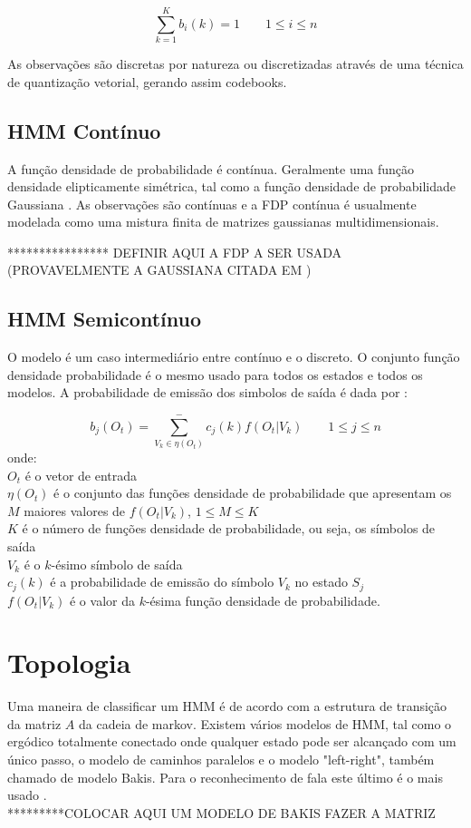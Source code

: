 $$
\displaystyle \sum_{k=1}^K b_i (k) = 1 \qquad 1 \leq i \leq n 
$$

As observações são discretas por natureza ou discretizadas através de uma técnica de quantização vetorial, gerando assim codebooks.
 


\subsection{HMM Contínuo}

\quad A função densidade de probabilidade é contínua. Geralmente uma função densidade elipticamente simétrica, tal como a função densidade de probabilidade Gaussiana \cite{fundRecFala}. As observações são contínuas e a FDP contínua é  usualmente modelada como uma mistura finita de matrizes gaussianas multidimensionais.

****************
 DEFINIR AQUI A FDP A SER USADA (PROVAVELMENTE A GAUSSIANA CITADA EM  \cite{fundRecFala})


\subsection{HMM Semicontínuo}

\quad O modelo é um caso intermediário entre contínuo e o discreto. O conjunto função densidade probabilidade é o mesmo usado para todos os estados e todos os modelos. A probabilidade de emissão dos simbolos de saída é dada por :


$$
\displaystyle b_j(O_t) =  \sum_{V_k \in \eta (O_t)}^-  c_j (k) f (O_t | V_k)   \qquad 1 \leq j \leq n 
$$
 onde:\\
$O_t$ é o vetor de entrada\\
$\eta(O_t)$ é o conjunto das funções densidade de probabilidade que apresentam os $M$ maiores valores de $f (O_t | V_k)$, $ 1 \leq M \leq K$\\
$K$ é o número de funções densidade de probabilidade, ou seja, os símbolos de saída\\
$V_k$ é o $k$-ésimo símbolo de saída\\
$ c_j (k)$ é a probabilidade de emissão do símbolo $V_k$ no estado $S_j$\\
$f (O_t | V_k)$ é o valor da $k$-ésima função densidade de probabilidade.



\section{Topologia}

\quad Uma maneira de classificar um HMM é de acordo com a estrutura de transição da matriz $A$ da cadeia de markov. Existem vários modelos de HMM, tal como o ergódico totalmente conectado onde qualquer estado pode ser alcançado com um único passo, o modelo de caminhos paralelos e o modelo "left-right", também chamado de modelo Bakis. Para o reconhecimento de fala este último é o mais usado \cite{fundRecFala}.\\ *********COLOCAR AQUI UM MODELO DE BAKIS FAZER A MATRIZ










